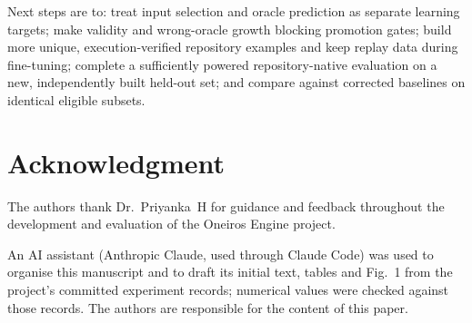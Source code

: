 \documentclass[conference,a4paper]{IEEEtran}
\newif\ifanonymous
\begin{document}
Next steps are to: treat input selection and oracle prediction as separate learning
targets; make validity and wrong-oracle growth blocking promotion gates; build more
unique, execution-verified repository examples and keep replay data during
fine-tuning; complete a sufficiently powered repository-native evaluation on a new,
independently built held-out set; and compare against corrected baselines on identical
eligible subsets.

\section*{Acknowledgment}
\ifanonymous\else
The authors thank Dr.~Priyanka~H for guidance and feedback throughout the development
and evaluation of the Oneiros Engine project.
\fi
An AI assistant (Anthropic Claude, used through Claude Code) was used to organise this
manuscript and to draft its initial text, tables and Fig.~1 from the project's
committed experiment records; numerical values were checked against those records.
The authors are responsible for the content of this paper.



\end{document}
